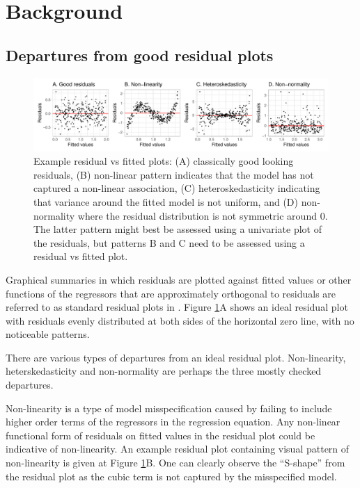 \documentclass[]{interact}
\theoremstyle{plain}%
\theoremstyle{definition}
\theoremstyle{remark}
\begin{document}
\hypertarget{background}{%
\section{Background}\label{background}}

\hypertarget{departures-from-good-residual-plots}{%
\subsection{Departures from good residual
plots}\label{departures-from-good-residual-plots}}

\begin{figure}

{\centering \includegraphics[width=1\linewidth]{paper_comparison_files/figure-latex/residual-plot-common-departures-1} 

}

\caption{Example residual vs fitted plots: (A) classically good looking residuals, (B) non-linear pattern indicates that the model has not captured a non-linear association, (C) heteroskedasticity indicating that variance around the fitted model is not uniform, and (D) non-normality where the residual distribution is not symmetric around 0. The latter pattern might best be assessed using a univariate plot of the residuals, but patterns B and C need to be assessed using a residual vs fitted plot.}\label{fig:residual-plot-common-departures}
\end{figure}

Graphical summaries in which residuals are plotted against fitted values
or other functions of the regressors that are approximately orthogonal
to residuals are referred to as standard residual plots in
\citet{cook1982residuals}. Figure
\ref{fig:residual-plot-common-departures}A shows an ideal residual plot
with residuals evenly distributed at both sides of the horizontal zero
line, with no noticeable patterns.

There are various types of departures from an ideal residual plot.
Non-linearity, heterskedasticity and non-normality are perhaps the three
mostly checked departures.

Non-linearity is a type of model misspecification caused by failing to
include higher order terms of the regressors in the regression equation.
Any non-linear functional form of residuals on fitted values in the
residual plot could be indicative of non-linearity. An example residual
plot containing visual pattern of non-linearity is given at Figure
\ref{fig:residual-plot-common-departures}B. One can clearly observe the
``S-shape'' from the residual plot as the cubic term is not captured by
the misspecified model.
\end{document}
